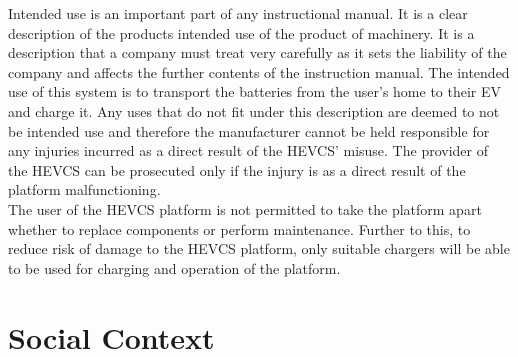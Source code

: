 \documentclass [12pt]{article}
\begin{document}
Intended use is an important part of any instructional manual. It is a clear description of the products intended use of the product of machinery. It is a description that a company must treat very carefully as it sets the liability of the company and affects the further contents of the instruction manual. \cite{Intended_Use}
The intended use of this system is to transport the batteries from the user’s home to their EV and charge it. Any uses that do not fit under this description are deemed to not be intended use and therefore the manufacturer cannot be held responsible for any injuries incurred as a direct result of the HEVCS’ misuse. The provider of the HEVCS can be prosecuted only if the injury is as a direct result of the platform malfunctioning. 
\\
The user of the HEVCS platform is not permitted to take the platform apart whether to replace components or perform maintenance. Further to this, to reduce risk of damage to the HEVCS platform, only suitable chargers will be able to be used for charging and operation of the platform. 

\section{Social Context}\label{sec:Social_Context}
\end{document}
